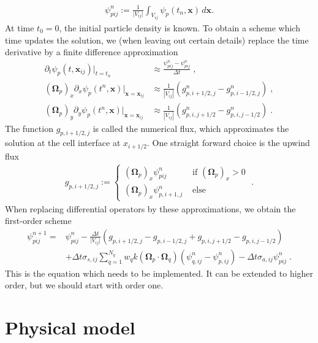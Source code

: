 \documentclass[10pt,a4paper]{article}
\begin{document}
\begin{align*}
\psi_{pij}^n := \frac{1}{\vert V_{ij}\vert}\int_{V_{ij}} \psi_p(t_n,\bm x)\,d\bm x.
\end{align*}
At time $t_0 = 0$, the initial particle density is known. To obtain a scheme which time updates the solution, we (when leaving out certain details) replace the time derivative by a finite difference approximation
\begin{align*}
\partial_t \psi_p(t,\bm x_{ij})\Big\vert_{t = t_n} &\approx \frac{\psi_{pij}^n-\psi_{pij}^n}{\Delta t}\;, \\
(\bm\Omega_p)_x\partial_x \psi_p(t^n,\bm x)\Big\vert_{\bm x = \bm x_{ij}} &\approx \frac{1}{|V_{ij}|} \left( g_{p,i+1/2,j}^n - g_{p,i-1/2,j}^n \right)\;, \\
(\bm\Omega_p)_y\partial_y \psi_p(t^n,\bm x)\Big\vert_{\bm x = \bm x_{ij}} &\approx \frac{1}{|V_{ij}|} \left( g_{p,i,j+1/2}^n - g_{p,i,j-1/2}^n \right)\;.
\end{align*}
The function $g_{p,i+1/2,j}$ is called the numerical flux, which approximates the solution at the cell interface at $x_{i+1/2}$. One straight forward choice is the upwind flux
\begin{align*}
g_{p,i+1/2,j} := 
\begin{cases}
(\bm\Omega_p)_x \psi_{pij}^{n} & \text{ if }(\bm\Omega_p)_x>0\\
(\bm\Omega_p)_x \psi_{p,i+1,j}^{n} & \text{ else}
\end{cases}\;.
\end{align*}
When replacing differential operators by these approximations, we obtain the first-order scheme
\begin{align}\label{eq:FV}
\psi_{pij}^{n+1} =& \psi_{pij}^{n} - \frac{\Delta t}{\vert V_{ij} \vert} \left( g_{p,i+1/2,j} - g_{p,i-1/2,j} + g_{p,i,j+1/2}- g_{p,i,j-1/2} \right)\nonumber \\
&+\Delta t  \sigma_{s,ij}\sum_{q=1}^{N_q} w_q k(\bm\Omega_p\cdot\bm\Omega_q) \left(\psi_{q,ij}^{n}-\psi_{p,ij}^{n}\right)-\Delta t\sigma_{a,ij} \psi_{pij}^{n}\;.
\end{align}
This is the equation which needs to be implemented. It can be extended to higher order, but we should start with order one.

\section{Physical model}
\end{document}
